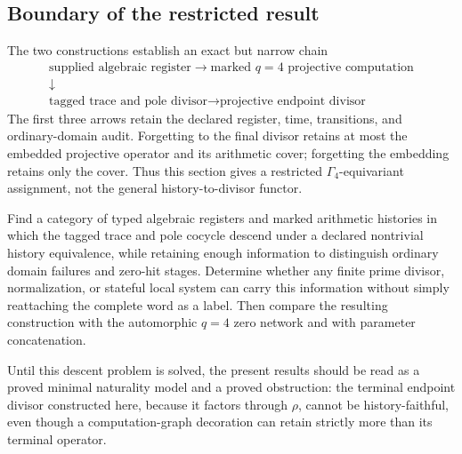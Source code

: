 \subsection{Boundary of the restricted result}
\label{subsec:history-divisor-restricted-boundary}

The two constructions establish an exact but narrow chain
\[
 \boxed{
 \begin{gathered}
 \text{supplied algebraic register}
 \longrightarrow
 \text{marked }q=4\text{ projective computation}\\
 \mathord\downarrow\\[-2pt]
 \text{tagged trace and pole divisor}
 \longrightarrow
 \text{projective endpoint divisor}
 \end{gathered}}
\]
The first three arrows retain the declared register, time, transitions, and
ordinary-domain audit.  Forgetting to the final divisor retains at most the
embedded projective operator and its arithmetic cover; forgetting the embedding
retains only the cover.  Thus this section gives a restricted
\(\Gamma_4\)-equivariant assignment, not the general history-to-divisor functor.

\begin{problem}
\label{prob:trace-decoration-descent}
Find a category of typed algebraic registers and marked arithmetic histories in
which the tagged trace and pole cocycle descend under a declared nontrivial
history equivalence, while retaining enough information to distinguish ordinary
domain failures and zero-hit stages.  Determine whether any finite prime divisor,
normalization, or stateful local system can carry this information without simply
reattaching the complete word as a label.  Then compare the resulting construction
with the automorphic \(q=4\) zero network and with parameter concatenation.
\end{problem}

Until this descent problem is solved, the present results should be read as a
proved minimal naturality model and a proved obstruction: the terminal endpoint
divisor constructed here, because it factors through \(\rho\), cannot be
history-faithful, even though a computation-graph decoration can retain strictly
more than its terminal operator.
